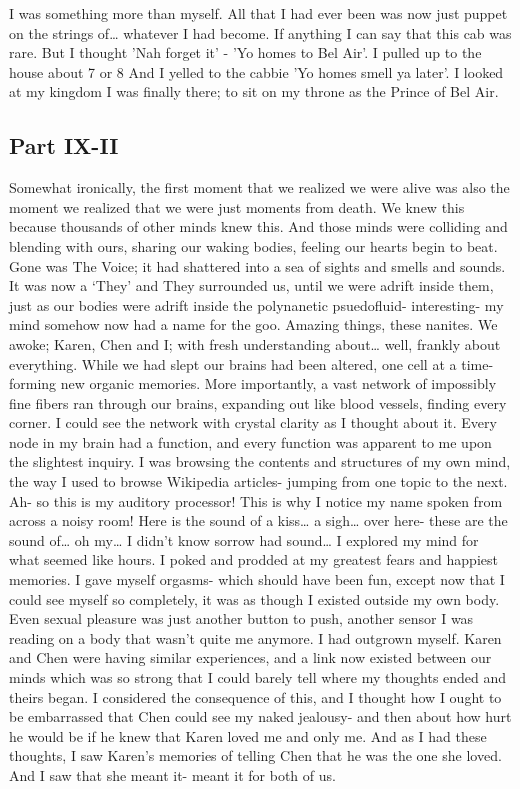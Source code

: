 \documentclass[a4paper]{article}
\begin{document}
I was something more than myself. All that I had ever been was now just puppet on the strings of… whatever I had become. If anything I can say that this cab was rare. But I thought 'Nah forget it' - 'Yo homes to Bel Air'. I pulled up to the house about 7 or 8 And I yelled to the cabbie 'Yo homes smell ya later'. I looked at my kingdom I was finally there; to sit on my throne as the Prince of Bel Air.

\subsection{Part IX-II}
Somewhat ironically, the first moment that we realized we were alive was also the moment we realized that we were just moments from death. We knew this because thousands of other minds knew this. And those minds were colliding and blending with ours, sharing our waking bodies, feeling our hearts begin to beat. Gone was The Voice; it had shattered into a sea of sights and smells and sounds. It was now a ‘They’ and They surrounded us, until we were adrift inside them, just as our bodies were adrift inside the polynanetic psuedofluid- interesting- my mind somehow now had a name for the goo.
Amazing things, these nanites. We awoke; Karen, Chen and I; with fresh understanding about… well, frankly about everything. While we had slept our brains had been altered, one cell at a time- forming new organic memories. More importantly, a vast network of impossibly fine fibers ran through our brains, expanding out like blood vessels, finding every corner. I could see the network with crystal clarity as I thought about it. Every node in my brain had a function, and every function was apparent to me upon the slightest inquiry.
I was browsing the contents and structures of my own mind, the way I used to browse Wikipedia articles- jumping from one topic to the next. Ah- so this is my auditory processor! This is why I notice my name spoken from across a noisy room! Here is the sound of a kiss… a sigh… over here- these are the sound of… oh my… I didn’t know sorrow had sound…
I explored my mind for what seemed like hours. I poked and prodded at my greatest fears and happiest memories. I gave myself orgasms- which should have been fun, except now that I could see myself so completely, it was as though I existed outside my own body. Even sexual pleasure was just another button to push, another sensor I was reading on a body that wasn’t quite me anymore. I had outgrown myself.
Karen and Chen were having similar experiences, and a link now existed between our minds which was so strong that I could barely tell where my thoughts ended and theirs began. I considered the consequence of this, and I thought how I ought to be embarrassed that Chen could see my naked jealousy- and then about how hurt he would be if he knew that Karen loved me and only me. And as I had these thoughts, I saw Karen’s memories of telling Chen that he was the one she loved. And I saw that she meant it- meant it for both of us.
\end{document}

